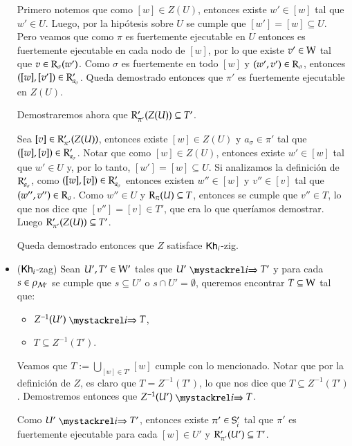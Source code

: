 \begin{demostracion}
\begin{itemize}
        Primero notemos que como $[w] \in Z(U)$, entonces existe $w' \in [w]$ tal que $w' \in U$. Luego, por la hipótesis sobre $U$
        se cumple que $[w'] = [w] \subseteq U$. Pero veamos que como $\pi$ es fuertemente ejecutable en $U$ entonces es fuertemente ejecutable en cada nodo 
        de $[w]$, por lo que existe $v' \in \W$ tal que $v \in \R_\sigma(w')$. Como $\sigma$ es fuertemente en todo $[w]$ y $(w',v') \in \R_\sigma$, entonces 
        $([w],[v']) \in \R'_{a_\sigma}$. Queda demostrado entonces que $\pi'$ es fuertemente ejecutable en $Z(U)$.
        
        Demostraremos ahora que $\R'_{\pi'}(Z(U)) \subseteq T'$.

        Sea $[v] \in \R'_{\pi'}(Z(U))$, entonces existe $[w] \in Z(U)$ y $a_\sigma \in \pi'$ tal que $([w],[v]) \in \R'_{a_\sigma}$. Notar que 
        como $[w] \in Z(U)$, entonces existe $w' \in [w]$ tal que $w' \in U$ y, por lo tanto, $[w'] = [w] \subseteq U$. Si analizamos la definición 
        de $\R'_{a_\sigma}$, como $([w],[v]) \in \R'_{a_\sigma}$ entonces existen $w'' \in [w]$ y $v'' \in [v]$ tal que $(w'',v'') \in \R_\sigma$.
        Como $w'' \in U$ y $\R_\pi(U) \subseteq T$, entonces se cumple que $v'' \in T$, lo que nos dice que $[v''] = [v] \in T'$, que era lo que 
        queríamos demostrar. Luego $\R'_{\pi'}(Z(U)) \subseteq T'$. 

        Queda demostrado entonces que $Z$ satisface $\khi$-zig.

        \item ($\khi$-zag) Sean $U', T' \in \W'$ tales que $U' \ultsExecAgi T'$ y para cada $s \in \rho_{\modults'}$ se cumple que $s \subseteq U'$ o 
        $s \cap U' = \emptyset$, queremos encontrar $T \subseteq \W$ tal que:
        \begin{multicols}{2}
            \begin{itemize}
                \item $Z^{-1}(U') \ultsExecAgi T$, 
                \item $T \subseteq Z^{-1}(T')$.
            \end{itemize}
        \end{multicols}
        
        Veamos que $T := \bigcup\limits_{[w] \in T'} [w]$ cumple con lo mencionado. Notar que por la definición de $Z$, es claro que $T = Z^{-1}(T')$, lo que nos dice que $T \subseteq Z^{-1}(T')$. Demostremos entonces que $Z^{-1}(U') \ultsExecAgi T$. 
    
        Como $U' \ultsExecAgi T'$, entonces existe $\pi' \in \S_i'$ tal que $\pi'$ es fuertemente ejecutable para cada $[w] \in U'$ y $\R'_{\pi'}(U') \subseteq T'$.


\end{itemize}
\end{demostracion}
